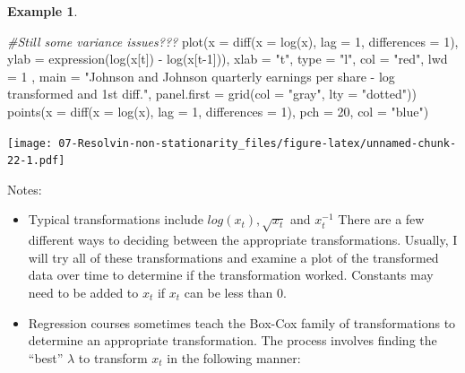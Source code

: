 \documentclass[
]{book}
\newenvironment{Shaded}{\begin{snugshade}}{\end{snugshade}}
\newcommand{\AttributeTok}[1]{\textcolor[rgb]{0.77,0.63,0.00}{#1}}
\newcommand{\CommentTok}[1]{\textcolor[rgb]{0.56,0.35,0.01}{\textit{#1}}}
\newcommand{\DecValTok}[1]{\textcolor[rgb]{0.00,0.00,0.81}{#1}}
\newcommand{\FunctionTok}[1]{\textcolor[rgb]{0.00,0.00,0.00}{#1}}
\newcommand{\NormalTok}[1]{#1}
\newcommand{\SpecialCharTok}[1]{\textcolor[rgb]{0.00,0.00,0.00}{#1}}
\newcommand{\StringTok}[1]{\textcolor[rgb]{0.31,0.60,0.02}{#1}}
\providecommand{\tightlist}{%
  \setlength{\itemsep}{0pt}\setlength{\parskip}{0pt}}
\theoremstyle{definition}
\theoremstyle{definition}
\newtheorem{example}{Example}[chapter]
\theoremstyle{definition}
\theoremstyle{definition}
\theoremstyle{remark}
\begin{document}
\begin{example}
\begin{Shaded}
\begin{Highlighting}[]
\CommentTok{\#Still some variance issues???}
\FunctionTok{plot}\NormalTok{(}\AttributeTok{x =} \FunctionTok{diff}\NormalTok{(}\AttributeTok{x =} \FunctionTok{log}\NormalTok{(x), }\AttributeTok{lag =} \DecValTok{1}\NormalTok{, }\AttributeTok{differences =} \DecValTok{1}\NormalTok{), }\AttributeTok{ylab =} \FunctionTok{expression}\NormalTok{(}\FunctionTok{log}\NormalTok{(x[t]) }\SpecialCharTok{{-}} \FunctionTok{log}\NormalTok{(x[t}\DecValTok{{-}1}\NormalTok{])), }\AttributeTok{xlab =} \StringTok{"t"}\NormalTok{, }\AttributeTok{type =} \StringTok{"l"}\NormalTok{, }\AttributeTok{col =} \StringTok{"red"}\NormalTok{, }\AttributeTok{lwd =} \DecValTok{1}\NormalTok{ , }
     \AttributeTok{main =} \StringTok{"Johnson and Johnson quarterly earnings per share {-} log transformed and 1st diff."}\NormalTok{, }
     \AttributeTok{panel.first =} \FunctionTok{grid}\NormalTok{(}\AttributeTok{col =} \StringTok{"gray"}\NormalTok{, }\AttributeTok{lty =} \StringTok{"dotted"}\NormalTok{))}
\FunctionTok{points}\NormalTok{(}\AttributeTok{x =} \FunctionTok{diff}\NormalTok{(}\AttributeTok{x =} \FunctionTok{log}\NormalTok{(x), }\AttributeTok{lag =} \DecValTok{1}\NormalTok{, }\AttributeTok{differences =} \DecValTok{1}\NormalTok{), }\AttributeTok{pch =} \DecValTok{20}\NormalTok{, }\AttributeTok{col =} \StringTok{"blue"}\NormalTok{)}
\end{Highlighting}
\end{Shaded}

\texttt{[image: 07-Resolvin-non-stationarity\_files/figure-latex/unnamed-chunk-22-1.pdf]}
\end{example}

Notes:

\begin{itemize}
\tightlist
\item
  Typical transformations include \(log(x_t),\sqrt{x_t}\) and \(x_t^{-1}\) There are a few different ways to deciding between the appropriate transformations. Usually, I will try all of these transformations and examine a plot of the transformed data over time to determine if the transformation worked. Constants may need to be added to \(x_t\) if \(x_t\) can be less than 0.\\
\item
  Regression courses sometimes teach the Box-Cox family of transformations to determine an appropriate transformation. The process involves finding the ``best'' \(\lambda\) to transform \(x_t\) in the following manner:
\end{itemize}
\end{document}

